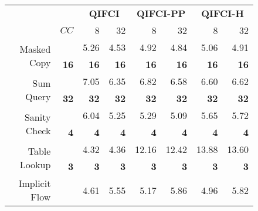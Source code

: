 \begin{figure}
\begin{table}[H]
\begin{tabular}{rr|rrrrrr}
                                      &              & \multicolumn{2}{c}{\textbf{QIFCI}}              & \multicolumn{2}{c}{\textbf{QIFCI-PP}}            & \multicolumn{2}{c}{\textbf{QIFCI-H}} \\
                                      & $CC$         & 8            & \multicolumn{1}{r|}{32}           & 8            & \multicolumn{1}{r|}{32}           & 8                 & 32               \\ \hline
\multirow{2}{*}{Masked Copy}          &              & 5.26         & \multicolumn{1}{r|}{4.53}         & 4.92         & \multicolumn{1}{r|}{4.84}         & 5.06              & 4.91             \\
                                      & \textbf{16}  & \textbf{16}  & \multicolumn{1}{r|}{\textbf{16}}  & \textbf{16}  & \multicolumn{1}{r|}{\textbf{16}}  & \textbf{16}       & \textbf{16}      \\ \hline
\multirow{2}{*}{Sum Query}            &              & 7.05         & \multicolumn{1}{r|}{6.35}         & 6.82         & \multicolumn{1}{r|}{6.58}         & 6.60              & 6.62             \\
                                      & \textbf{32}  & \textbf{32}  & \multicolumn{1}{r|}{\textbf{32}}  & \textbf{32}  & \multicolumn{1}{r|}{\textbf{32}}  & \textbf{32}       & \textbf{32}      \\ \hline
\multirow{2}{*}{Sanity Check}         &              & 6.04         & \multicolumn{1}{r|}{5.25}         & 5.29         & \multicolumn{1}{r|}{5.09}         & 5.65              & 5.72             \\
                                      & \textbf{4}   & \textbf{4}   & \multicolumn{1}{r|}{\textbf{4}}   & \textbf{4}   & \multicolumn{1}{r|}{\textbf{4}}   & \textbf{4}        & \textbf{4}       \\ \hline
\multirow{2}{*}{Table Lookup}         &              & 4.32         & \multicolumn{1}{r|}{4.36}         & 12.16        & \multicolumn{1}{r|}{12.42}        & 13.88             & 13.60            \\
                                      & \textbf{3}   & \textbf{3}   & \multicolumn{1}{r|}{\textbf{3}}   & \textbf{3}   & \multicolumn{1}{r|}{\textbf{3}}   & \textbf{3}        & \textbf{3}       \\ \hline
\multirow{2}{*}{Implicit Flow}        &              & 4.61         & \multicolumn{1}{r|}{5.55}         & 5.17         & \multicolumn{1}{r|}{5.86}         & 4.96              & 5.82             \\

\end{tabular}
\end{table}
\end{figure}
